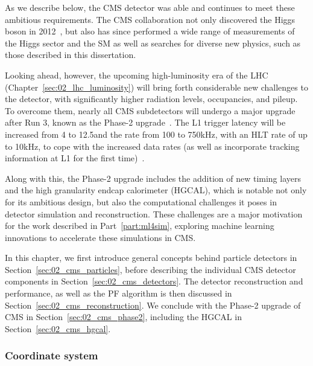 As we describe below, the CMS detector was able and continues to meet these ambitious requirements.
The CMS collaboration not only discovered the Higgs boson in 2012~\cite{CMS:2012qbp}, but also has since performed a wide range of measurements of the Higgs sector and the SM as well as searches for diverse new physics, such as those described in this dissertation.

Looking ahead, however, the upcoming high-luminosity era of the LHC (Chapter~\ref{sec:02_lhc_luminosity}) will bring forth considerable new challenges to the detector, with significantly higher radiation levels, occupancies, and pileup.
To overcome them, nearly all CMS subdetectors will undergo a major upgrade after Run 3, known as the Phase-2 upgrade~\cite{CMS:2017lum}.
The L1 trigger latency will be increased from 4 to 12.5\mus and the rate from 100 to 750\unit{kHz}, with an HLT rate of up to 10\unit{kHz}, to cope with the increased data rates (as well as incorporate tracking information at L1 for the first time)~\cite{Yates:2021dxs}.

Along with this, the Phase-2 upgrade includes the addition of new timing layers and the high granularity endcap calorimeter (HGCAL), which is notable not only for its ambitious design, but also the computational challenges it poses in detector simulation and reconstruction.
These challenges are a major motivation for the work described in Part~\ref{part:ml4sim}, exploring machine learning innovations to accelerate these simulations in CMS.

In this chapter, we first introduce general concepts behind particle detectors in Section~\ref{sec:02_cms_particles}, before describing the individual CMS detector components in Section~\ref{sec:02_cms_detectors}.
The detector reconstruction and performance, as well as the PF algorithm is then discussed in Section~\ref{sec:02_cms_reconstruction}.
We conclude with the Phase-2 upgrade of CMS in Section~\ref{sec:02_cms_phase2}, including the HGCAL in Section~\ref{sec:02_cms_hgcal}.

\subsubsection{Coordinate system}

